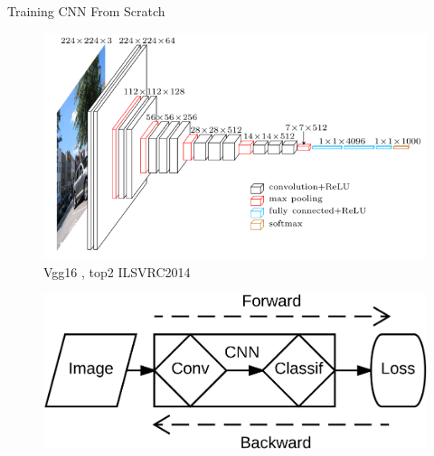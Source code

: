 \begin{frame}{Training CNN From Scratch}

	\begin{figure}[h]
		\centering
		\includegraphics[width=.75\linewidth]{images/vgg16.png}
		\caption{\small Vgg16 \cite{simonyan2014very}, top2 ILSVRC2014}
		\label{fig:quora-invariance-1}
	\end{figure}
	
	\vspace{-.9cm}	
	
	\begin{figure}[h]
		\centering
		\includegraphics[width=.50\linewidth]{images/FromScratch.png}
		\label{fig:quora-invariance-1}
	\end{figure}
	
\end{frame}

